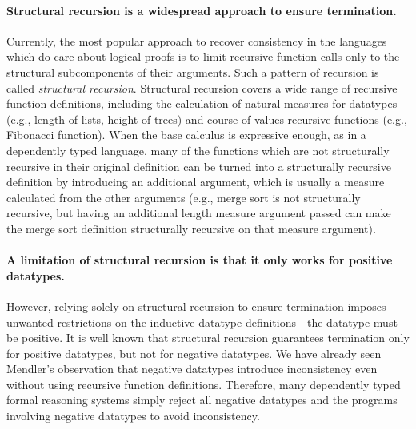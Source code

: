 \documentclass[letterpaper,12pt]{article}
\newcommand{\eg}[0]{e.g., }
\begin{document}
\paragraph{Structural recursion is a widespread approach
to ensure termination.}
Currently, the most popular approach to recover consistency in the languages
which do care about logical proofs is to limit recursive function calls
only to the structural subcomponents of their arguments. Such a pattern of
recursion is called \emph{structural recursion}. Structural recursion covers
a wide range of recursive function definitions, including the calculation of
natural measures for datatypes (\eg length of lists, height of trees) and
course of values recursive functions (\eg Fibonacci function).  When the
base calculus is expressive enough, as in a dependently typed language, many
of the functions which are not structurally recursive in their original
definition can be turned into a structurally recursive definition
by introducing an additional argument, which is usually a measure
calculated from the other arguments (\eg merge sort is
not structurally recursive, but having an additional length measure
argument passed can make the merge sort definition structurally recursive
on that measure argument).

\paragraph{A limitation of structural recursion is that it
only works for positive datatypes.}
However, relying solely on structural recursion to ensure termination
imposes unwanted restrictions on the inductive datatype definitions
- the datatype must be positive.
It is well known that structural recursion guarantees termination
only for positive datatypes, but not for negative datatypes.
We have already seen Mendler's observation that negative datatypes
introduce inconsistency even without using recursive function definitions. 
Therefore, many dependently typed formal reasoning systems simply reject
all negative datatypes and the programs involving negative datatypes
to avoid inconsistency.
\end{document}
